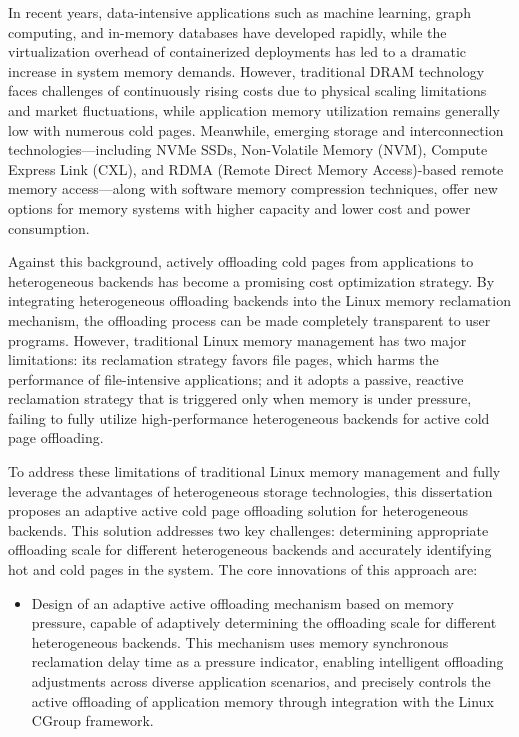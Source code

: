 \begin{englishabstract}

In recent years, data-intensive applications such as machine learning, graph computing, and in-memory databases have developed rapidly, while the virtualization overhead of containerized deployments has led to a dramatic increase in system memory demands. However, traditional DRAM technology faces challenges of continuously rising costs due to physical scaling limitations and market fluctuations, while application memory utilization remains generally low with numerous cold pages. Meanwhile, emerging storage and interconnection technologies—including NVMe SSDs, Non-Volatile Memory (NVM), Compute Express Link (CXL), and RDMA (Remote Direct Memory Access)-based remote memory access—along with software memory compression techniques, offer new options for memory systems with higher capacity and lower cost and power consumption.

Against this background, actively offloading cold pages from applications to heterogeneous backends has become a promising cost optimization strategy. By integrating heterogeneous offloading backends into the Linux memory reclamation mechanism, the offloading process can be made completely transparent to user programs. However, traditional Linux memory management has two major limitations: its reclamation strategy favors file pages, which harms the performance of file-intensive applications; and it adopts a passive, reactive reclamation strategy that is triggered only when memory is under pressure, failing to fully utilize high-performance heterogeneous backends for active cold page offloading.
    
To address these limitations of traditional Linux memory management and fully leverage the advantages of heterogeneous storage technologies, this dissertation proposes an adaptive active cold page offloading solution for heterogeneous backends. This solution addresses two key challenges: determining appropriate offloading scale for different heterogeneous backends and accurately identifying hot and cold pages in the system. The core innovations of this approach are:

\begin{itemize}
    \item Design of an adaptive active offloading mechanism based on memory pressure, capable of adaptively determining the offloading scale for different heterogeneous backends. This mechanism uses memory synchronous reclamation delay time as a pressure indicator, enabling intelligent offloading adjustments across diverse application scenarios, and precisely controls the active offloading of application memory through integration with the Linux CGroup framework.


\end{itemize}
\end{englishabstract}

